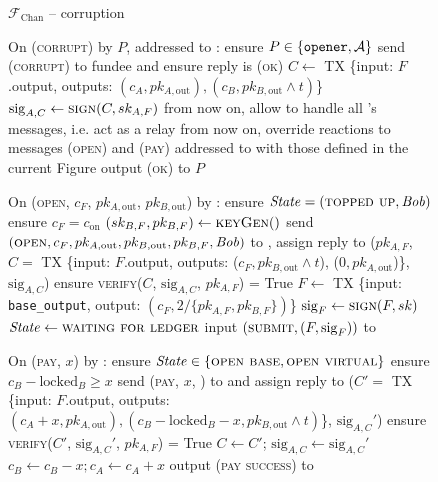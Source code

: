 \begin{figure}[H]
  \begin{systembox}{$\mathcal{F}_{\mathrm{Chan}}$ -- corruption}
    \begin{algorithmic}[1]
      \State On (\textsc{corrupt}) by $P$, addressed to \alice:
      \Indent
        \State ensure $P \in \{\mathtt{opener}, \mathcal{A}\}$
          \State send (\textsc{corrupt}) to fundee and ensure reply is
          (\textsc{ok})
        \EndFor
          \State $C \gets$ TX \{input: $F$.output, outputs: $(c_A, pk_{A,
          \mathrm{out}}), (c_B, pk_{B, \mathrm{out}} \wedge t)$\}
          \State $\mathrm{sig}_{A, C} \gets \textsc{sign}(C, sk_{A, F})$
        \EndIf
        \State from now on, allow \adversary to handle all \alice's messages,
        i.e. act as a relay
          \State from now on, override reactions to messages (\textsc{open}) and
          (\textsc{pay}) addressed to \bob with those defined in the current
          Figure
        \EndIf
        \State output (\textsc{ok}) to $P$
      \EndIndent
      \Statex

      \State On (\textsc{open}, $c_F$, $pk_{A, \mathrm{out}}$, $pk_{B,
      \mathrm{out}}$) by \bob:
      \Indent
        \State ensure $\mathit{State} = (\textsc{topped up}, \mathit{Bob})$ 
        \State ensure $c_F = c_{\mathrm{on}}$
        \State $(sk_{B, F}, pk_{B, F}) \gets \textsc{keyGen}()$
        \State send $(\textsc{open}, c_F, pk_{A, \mathrm{out}}, pk_{B,
        \mathrm{out}}, pk_{B, F}, \mathit{Bob})$ to \adversary, assign reply to ($pk_{A,
        F}$, $C =$ TX \{input: $F$.output, outputs: ($c_F, pk_{B, \mathrm{out}}
        \wedge t$), ($0, pk_{A, \mathrm{out}}$)\}, $\mathrm{sig}_{A, C}$)
        \State ensure \textsc{verify}($C$, $\mathrm{sig}_{A, C}$, $pk_{A, F}$) =
        True
        \State $F \gets$ TX \{input: \texttt{base\_output}, output: $(c_F,
        2/\{pk_{A, F}, pk_{B, F}\})$\}
        \State $\mathrm{sig}_F \gets \textsc{sign}(F, sk)$
        \State $\mathit{State} \gets \textsc{waiting for ledger}$
        \State input $(\textsc{submit}, (F, \mathrm{sig}_F))$ to \ledger
      \EndIndent
      \Statex

      \State On (\textsc{pay}, $x$) by \bob:
      \Indent
        \State ensure $\mathit{State} \in \{\textsc{open base}, \textsc{open
        virtual}\}$
        \State ensure $c_B - \mathrm{locked}_B \geq x$
        \State send (\textsc{pay}, $x$, \bob) to \adversary and assign reply to
        ($C' =$ TX \{input: $F$.output, outputs: $(c_A + x, pk_{A, \mathrm{out}}),
        (c_B - \mathrm{locked}_B - x, pk_{B, \mathrm{out}} \wedge t)$\},
        $\mathrm{sig}_{A, C}'$) 
        \State ensure \textsc{verify}($C'$, $\mathrm{sig}_{A, C}'$, $pk_{A, F}$)
        = True
        \State $C \gets C'$; $\mathrm{sig}_{A, C} \gets \mathrm{sig}_{A, C}'$
        \State $c_B \gets c_B - x; c_A \gets c_A + x$
        \State output (\textsc{pay success}) to \bob
      \EndIndent
      \Statex


\end{algorithmic}
\end{systembox}
\end{figure}
